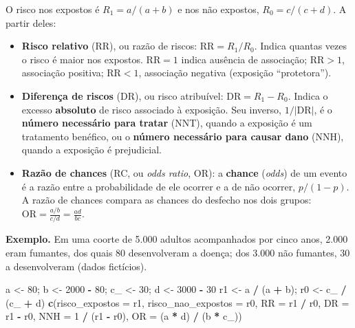 \documentclass[
]{book}
\newenvironment{Shaded}{\begin{snugshade}}{\end{snugshade}}
\newcommand{\AttributeTok}[1]{\textcolor[rgb]{0.13,0.29,0.53}{#1}}
\newcommand{\DecValTok}[1]{\textcolor[rgb]{0.00,0.00,0.81}{#1}}
\newcommand{\FunctionTok}[1]{\textcolor[rgb]{0.13,0.29,0.53}{\textbf{#1}}}
\newcommand{\NormalTok}[1]{#1}
\newcommand{\OtherTok}[1]{\textcolor[rgb]{0.56,0.35,0.01}{#1}}
\newcommand{\SpecialCharTok}[1]{\textcolor[rgb]{0.81,0.36,0.00}{\textbf{#1}}}
\providecommand{\tightlist}{%
  \setlength{\itemsep}{0pt}\setlength{\parskip}{0pt}}
\begin{document}
O risco nos expostos é \(R_1 = a/(a+b)\) e nos não expostos, \(R_0 = c/(c+d)\). A partir deles:

\begin{itemize}
\tightlist
\item
  \textbf{Risco relativo} (RR), ou razão de riscos: \(\text{RR} = R_1/R_0\). Indica quantas vezes o risco é maior nos expostos. \(\text{RR} = 1\) indica ausência de associação; \(\text{RR} > 1\), associação positiva; \(\text{RR} < 1\), associação negativa (exposição ``protetora'').
\item
  \textbf{Diferença de riscos} (DR), ou risco atribuível: \(\text{DR} = R_1 - R_0\). Indica o excesso \textbf{absoluto} de risco associado à exposição. Seu inverso, \(1/|\text{DR}|\), é o \textbf{número necessário para tratar} (NNT), quando a exposição é um tratamento benéfico, ou o \textbf{número necessário para causar dano} (NNH), quando a exposição é prejudicial.
\item
  \textbf{Razão de chances} (RC, ou \emph{odds ratio}, OR): a \textbf{chance} (\emph{odds}) de um evento é a razão entre a probabilidade de ele ocorrer e a de não ocorrer, \(p/(1-p)\). A razão de chances compara as chances do desfecho nos dois grupos: \(\text{OR} = \frac{a/b}{c/d} = \frac{ad}{bc}\).
\end{itemize}

\textbf{Exemplo.} Em uma coorte de 5.000 adultos acompanhados por cinco anos, 2.000 eram fumantes, dos quais 80 desenvolveram a doença; dos 3.000 não fumantes, 30 a desenvolveram (dados fictícios).

\begin{Shaded}
\begin{Highlighting}[]
\NormalTok{a }\OtherTok{\textless{}{-}} \DecValTok{80}\NormalTok{; b }\OtherTok{\textless{}{-}} \DecValTok{2000} \SpecialCharTok{{-}} \DecValTok{80}\NormalTok{; c\_ }\OtherTok{\textless{}{-}} \DecValTok{30}\NormalTok{; d }\OtherTok{\textless{}{-}} \DecValTok{3000} \SpecialCharTok{{-}} \DecValTok{30}
\NormalTok{r1 }\OtherTok{\textless{}{-}}\NormalTok{ a }\SpecialCharTok{/}\NormalTok{ (a }\SpecialCharTok{+}\NormalTok{ b); r0 }\OtherTok{\textless{}{-}}\NormalTok{ c\_ }\SpecialCharTok{/}\NormalTok{ (c\_ }\SpecialCharTok{+}\NormalTok{ d)}
\FunctionTok{c}\NormalTok{(}\AttributeTok{risco\_expostos =}\NormalTok{ r1, }\AttributeTok{risco\_nao\_expostos =}\NormalTok{ r0,}
  \AttributeTok{RR =}\NormalTok{ r1 }\SpecialCharTok{/}\NormalTok{ r0, }\AttributeTok{DR =}\NormalTok{ r1 }\SpecialCharTok{{-}}\NormalTok{ r0, }\AttributeTok{NNH =} \DecValTok{1} \SpecialCharTok{/}\NormalTok{ (r1 }\SpecialCharTok{{-}}\NormalTok{ r0), }\AttributeTok{OR =}\NormalTok{ (a }\SpecialCharTok{*}\NormalTok{ d) }\SpecialCharTok{/}\NormalTok{ (b }\SpecialCharTok{*}\NormalTok{ c\_))}
\end{Highlighting}
\end{Shaded}
\end{document}
